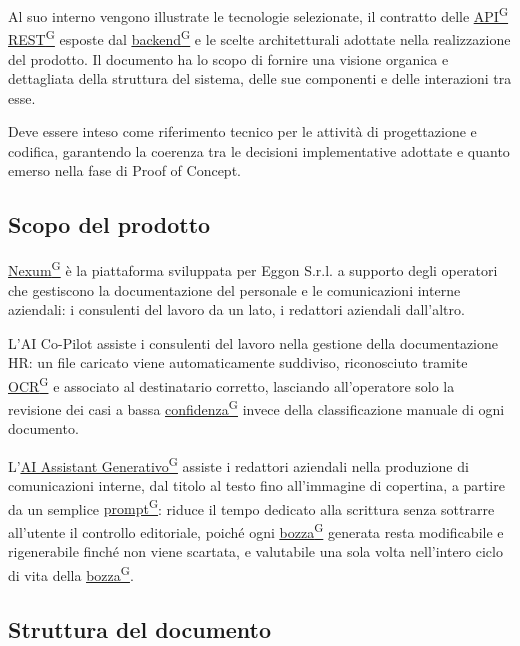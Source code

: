 \documentclass[a4paper,12pt]{article}
\providecommand{\glslink}[2]{\href{https://alittlebyte-19.github.io/Documentazione/glossario.html\#gls-#1}{\underline{#2}\textsuperscript{\scriptsize G}}}
\begin{document}
Al suo interno vengono illustrate le tecnologie selezionate, il contratto delle \glslink{api-application-programming-interface}{API} \glslink{rest-representational-state-transfer}{REST} esposte dal \glslink{backend}{backend} e le scelte architetturali adottate nella realizzazione del prodotto. Il documento ha lo scopo di fornire una visione organica e dettagliata della struttura del sistema, delle sue componenti e delle interazioni tra esse.

Deve essere inteso come riferimento tecnico per le attività di progettazione e codifica, garantendo la coerenza tra le decisioni implementative adottate e quanto emerso nella fase di Proof of Concept.

\subsection{Scopo del prodotto}

\glslink{nexum}{Nexum} è la piattaforma sviluppata per Eggon S.r.l. a supporto degli operatori che gestiscono la documentazione del personale e le comunicazioni interne aziendali: i consulenti del lavoro da un lato, i redattori aziendali dall'altro.

L'AI Co-Pilot assiste i consulenti del lavoro nella gestione della documentazione HR: un file caricato viene automaticamente suddiviso, riconosciuto tramite \glslink{ocr-riconoscimento-ottico-dei-caratteri}{OCR} e associato al destinatario corretto, lasciando all'operatore solo la revisione dei casi a bassa \glslink{confidenza-confidence-score}{confidenza} invece della classificazione manuale di ogni documento.

L'\glslink{ai-assistant-generativo-ai-assistant}{AI Assistant Generativo} assiste i redattori aziendali nella produzione di comunicazioni interne, dal titolo al testo fino all'immagine di copertina, a partire da un semplice \glslink{prompt}{prompt}: riduce il tempo dedicato alla scrittura senza sottrarre all'utente il controllo editoriale, poiché ogni \glslink{bozza-draft}{bozza} generata resta modificabile e rigenerabile finché non viene scartata, e valutabile una sola volta nell'intero ciclo di vita della \glslink{bozza-draft}{bozza}.

\subsection{Struttura del documento}
\end{document}
